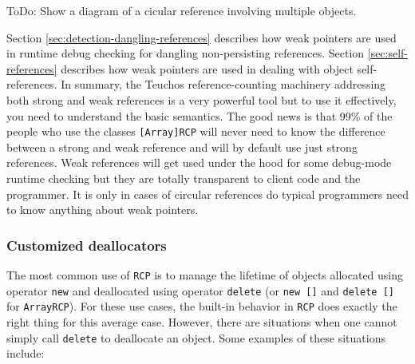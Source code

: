 \documentclass[pdf,ps2pdf,11pt]{SANDreport}
\begin{document}
ToDo: Show a diagram of a cicular reference involving multiple
objects.

Section {}\ref{sec:detection-dangling-references} describes how weak
pointers are used in runtime debug checking for dangling
non-persisting references.  Section {}\ref{sec:self-references}
describes how weak pointers are used in dealing with object
self-references.  In summary, the Teuchos reference-counting machinery
addressing both strong and weak references is a very powerful tool but
to use it effectively, you need to understand the basic semantics.
The good news is that 99\% of the people who use the classes
{}\texttt{[Array]RCP} will never need to know the difference between a
strong and weak reference and will by default use just strong
references.  Weak references will get used under the hood for some
debug-mode runtime checking but they are totally transparent to client
code and the programmer.  It is only in cases of circular references
do typical programmers need to know anything about weak pointers.


%
{}\subsubsection{Customized deallocators}
\label{sec:deallocators}
%

The most common use of {}\texttt{RCP} is to manage the lifetime of
objects allocated using operator {}\texttt{new} and deallocated using
operator {}\texttt{delete} (or {}\texttt{new []} and {}\texttt{delete
[]} for {}\texttt{ArrayRCP}).  For these use cases, the built-in
behavior in {}\texttt{RCP} does exactly the right thing for this
average case.  However, there are situations when one cannot simply
call {}\texttt{delete} to deallocate an object.  Some examples of
these situations include:
\end{document}
